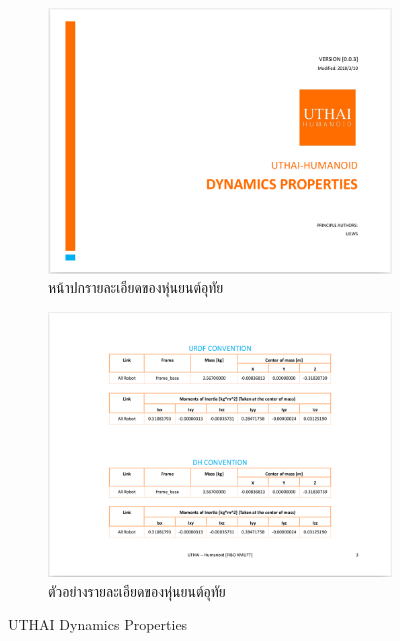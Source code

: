 \begin{figure}[!ht]
    \centering
    \begin{subfigure}[b]{0.45\textwidth}
        \centering
        \includegraphics[width=\textwidth]{chapter4/images/uthai_manual/uthai_dynamics.png}
        \caption{หน้าปกรายละเอียดของหุ่นยนต์อุทัย}
    \end{subfigure}
    \hfill
    \begin{subfigure}[b]{0.45\textwidth}
        \centering
        \includegraphics[width=\textwidth]{chapter4/images/uthai_manual/uthai_dynamics2.png}
        \caption{ตัวอย่างรายละเอียดของหุ่นยนต์อุทัย}
    \end{subfigure}
    \caption{UTHAI Dynamics Properties}
	\label{fig:uthai_dynamics_manual}
\end{figure}

